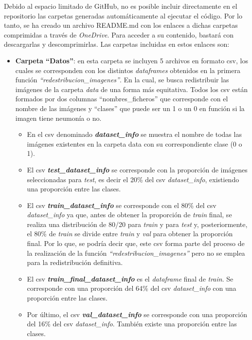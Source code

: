 \begin{itemize}
    Debido al espacio limitado de GitHub, no es posible incluir directamente en el repositorio las carpetas generadas automáticamente al ejecutar el código. Por lo tanto, se ha creado un archivo README.md con los enlaces a dichas carpetas comprimidas a través de \textit{OneDrive}. Para acceder a su contenido, bastará con descargarlas y descomprimirlas. Las carpetas incluidas en estos enlaces son:
    
    \begin{itemize}
        \item \textbf{Carpeta ``Datos''}: en esta carpeta se incluyen 5 archivos en formato csv, los cuales se corresponden con los distintos \textit{dataframes} obtenidos en la primera función \textit{``redestribucion\_imagenes''}. En la cual, se busca redistribuir las imágenes de la carpeta \textit{data} de una forma más equitativa. Todos los csv están formados por dos columnas ``nombres\_ficheros'' que corresponde con el nombre de las imágenes y ``clases'' que puede ser un 1 o un 0 en función si la imagen tiene neumonía o no. 
        \begin{itemize}
            \item En el csv denominado \textit{\textbf{dataset\_info}} se muestra el nombre de todas las imágenes existentes en la carpeta data con su correspondiente clase (0 o 1). 
            \item El csv \textit{\textbf{test\_dataset\_info}} se corresponde con la proporción de imágenes seleccionadas para \textit{test}, es decir el 20\% del csv \textit{dataset\_info}, existiendo una proporción entre las clases. 
            \item El csv \textit{\textbf{train\_dataset\_info}} se corresponde con el 80\% del csv \textit{dataset\_info} ya que, antes de obtener la proporción de \textit{train} final, se realiza una distribución de 80/20 para \textit{train} y para \textit{test} y, posteriormente, el 80\% de \textit{train} se divide entre \textit{train} y \textit{val} para obtener la proporción final. Por lo que, se podría decir que, este csv forma parte del proceso de la realización de la función \textit{``redestribucion\_imagenes''} pero no se emplea para la redistribución definitiva.
            \item El csv \textit{\textbf{train\_final\_dataset\_info}} es el \textit{dataframe} final de \textit{train}. Se corresponde con una proporción del 64\% del csv \textit{dataset\_info} con una proporción entre las clases.
            \item Por último, el csv \textit{\textbf{val\_dataset\_info}} se corresponde con una proporción del 16\% del csv \textit{dataset\_info}. También existe una proporción entre las clases.

\end{itemize}
\end{itemize}
\end{itemize}
